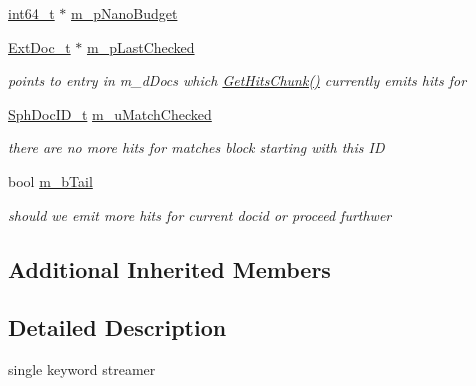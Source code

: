 \begin{DoxyCompactItemize}
\hyperlink{sphinxstd_8h_a996e72f71b11a5bb8b3b7b6936b1516d}{int64\-\_\-t} $\ast$ \hyperlink{classExtTerm__c_a67dce71e54b1467c16eb4866f5490ed9}{m\-\_\-p\-Nano\-Budget}
\item 
\hyperlink{structExtDoc__t}{Ext\-Doc\-\_\-t} $\ast$ \hyperlink{classExtTerm__c_a8af4c8bf1750fda58c1f6712655ee2c3}{m\-\_\-p\-Last\-Checked}
\begin{DoxyCompactList}\small\item\em points to entry in m\-\_\-d\-Docs which \hyperlink{classExtTerm__c_a0ab91a1da71996bea098ab1b757d0d3c}{Get\-Hits\-Chunk()} currently emits hits for \end{DoxyCompactList}\item 
\hyperlink{sphinx_8h_a3176771631c12a9e4897272003e6b447}{Sph\-Doc\-I\-D\-\_\-t} \hyperlink{classExtTerm__c_aea6c6742a9a1f4357fe0dca73432c244}{m\-\_\-u\-Match\-Checked}
\begin{DoxyCompactList}\small\item\em there are no more hits for matches block starting with this I\-D \end{DoxyCompactList}\item 
bool \hyperlink{classExtTerm__c_a5be35957c870d9734477590b9f4ff08b}{m\-\_\-b\-Tail}
\begin{DoxyCompactList}\small\item\em should we emit more hits for current docid or proceed furthwer \end{DoxyCompactList}\end{DoxyCompactItemize}
\subsection*{Additional Inherited Members}


\subsection{Detailed Description}
single keyword streamer 

